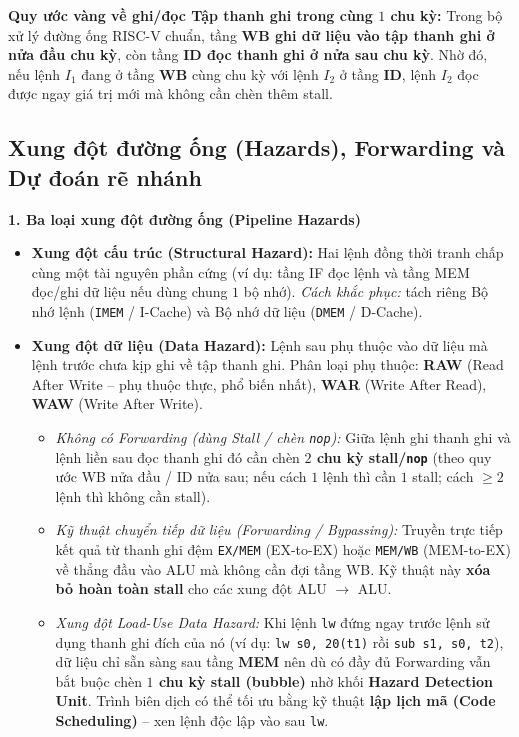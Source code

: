\textbf{Quy ước vàng về ghi/đọc Tập thanh ghi trong cùng $1$ chu kỳ:} Trong bộ xử lý đường ống RISC-V chuẩn, tầng \textbf{WB ghi dữ liệu vào tập thanh ghi ở nửa đầu chu kỳ}, còn tầng \textbf{ID đọc thanh ghi ở nửa sau chu kỳ}. Nhờ đó, nếu lệnh $I_1$ đang ở tầng \textbf{WB} cùng chu kỳ với lệnh $I_2$ ở tầng \textbf{ID}, lệnh $I_2$ đọc được ngay giá trị mới mà không cần chèn thêm stall.

\subsection{Xung đột đường ống (Hazards), Forwarding và Dự đoán rẽ nhánh}

\textbf{1. Ba loại xung đột đường ống (Pipeline Hazards)}
\begin{itemize}
    \item \textbf{Xung đột cấu trúc (Structural Hazard):} Hai lệnh đồng thời tranh chấp cùng một tài nguyên phần cứng (ví dụ: tầng IF đọc lệnh và tầng MEM đọc/ghi dữ liệu nếu dùng chung $1$ bộ nhớ). \textit{Cách khắc phục:} tách riêng Bộ nhớ lệnh (\texttt{IMEM} / I-Cache) và Bộ nhớ dữ liệu (\texttt{DMEM} / D-Cache).
    \item \textbf{Xung đột dữ liệu (Data Hazard):} Lệnh sau phụ thuộc vào dữ liệu mà lệnh trước chưa kịp ghi về tập thanh ghi. Phân loại phụ thuộc: \textbf{RAW} (Read After Write -- phụ thuộc thực, phổ biến nhất), \textbf{WAR} (Write After Read), \textbf{WAW} (Write After Write).
    \begin{itemize}
        \item \textit{Không có Forwarding (dùng Stall / chèn \texttt{nop}):} Giữa lệnh ghi thanh ghi và lệnh liền sau đọc thanh ghi đó cần chèn \textbf{$2$ chu kỳ stall/\texttt{nop}} (theo quy ước WB nửa đầu / ID nửa sau; nếu cách $1$ lệnh thì cần $1$ stall; cách $\ge 2$ lệnh thì không cần stall).
        \item \textit{Kỹ thuật chuyển tiếp dữ liệu (Forwarding / Bypassing):} Truyền trực tiếp kết quả từ thanh ghi đệm \texttt{EX/MEM} (EX-to-EX) hoặc \texttt{MEM/WB} (MEM-to-EX) về thẳng đầu vào ALU mà không cần đợi tầng WB. Kỹ thuật này \textbf{xóa bỏ hoàn toàn stall} cho các xung đột ALU $\rightarrow$ ALU.
        \item \textit{Xung đột Load-Use Data Hazard:} Khi lệnh \texttt{lw} đứng ngay trước lệnh sử dụng thanh ghi đích của nó (ví dụ: \texttt{lw s0, 20(t1)} rồi \texttt{sub s1, s0, t2}), dữ liệu chỉ sẵn sàng sau tầng \textbf{MEM} nên dù có đầy đủ Forwarding vẫn bắt buộc chèn \textbf{$1$ chu kỳ stall (bubble)} nhờ khối \textbf{Hazard Detection Unit}. Trình biên dịch có thể tối ưu bằng kỹ thuật \textbf{lập lịch mã (Code Scheduling)} -- xen lệnh độc lập vào sau \texttt{lw}.

\end{itemize}
\end{itemize}
